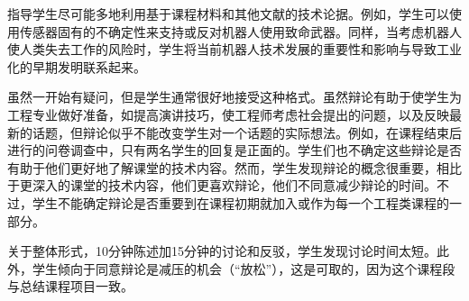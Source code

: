 
指导学生尽可能多地利用基于课程材料和其他文献的技术论据。例如，学生可以使用传感器固有的不确定性来支持或反对机器人使用致命武器。同样，当考虑机器人使人类失去工作的风险时，学生将当前机器人技术发展的重要性和影响与导致工业化的早期发明联系起来。


虽然一开始有疑问，但是学生通常很好地接受这种格式。虽然辩论有助于使学生为工程专业做好准备，如提高演讲技巧，使工程师考虑社会提出的问题，以及反映最新的话题，但辩论似乎不能改变学生对一个话题的实际想法。例如，在课程结束后进行的问卷调查中，只有两名学生的回复是正面的。学生们也不确定这些辩论是否有助于他们更好地了解课堂的技术内容。然而，学生发现辩论的概念很重要，相比于更深入的课堂的技术内容，他们更喜欢辩论，他们不同意减少辩论的时间。不过，学生不能确定辩论是否重要到在课程初期就加入或作为每一个工程类课程的一部分。


关于整体形式，10分钟陈述加15分钟的讨论和反驳，学生发现讨论时间太短。此外，学生倾向于同意辩论是减压的机会（“放松”），这是可取的，因为这个课程段与总结课程项目一致。